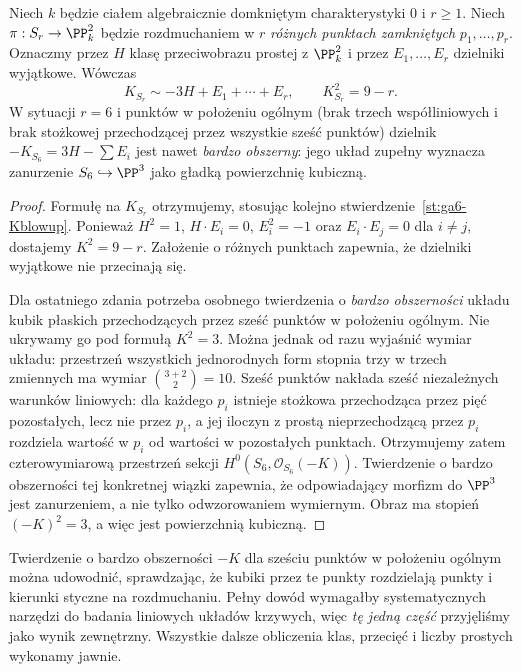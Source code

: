 \begin{stwierdzenie}
\label{st:ga6-del-pezzo-degree}
Niech $k$ będzie ciałem algebraicznie domkniętym
charakterystyki $0$ i $r\ge1$. Niech
$\pi:S_r\to\PP^2_k$ będzie rozdmuchaniem w $r$
\emph{różnych punktach zamkniętych}
$p_1,\ldots,p_r$. Oznaczmy przez $H$ klasę
przeciwobrazu prostej z $\PP^2_k$ i przez
$E_1,\ldots,E_r$ dzielniki wyjątkowe. Wówczas
\[
 K_{S_r}\sim-3H+E_1+\cdots+E_r,
 \qquad K_{S_r}^2=9-r.
\]
W sytuacji $r=6$ i punktów w położeniu ogólnym
(brak trzech współliniowych i brak stożkowej
przechodzącej przez wszystkie sześć punktów)
dzielnik $-K_{S_6}=3H-\sum E_i$ jest nawet
\emph{bardzo obszerny}: jego układ zupełny
wyznacza zanurzenie $S_6\hookrightarrow\PP^3$
jako gładką powierzchnię kubiczną.
\end{stwierdzenie}
\begin{proof}
Formułę na $K_{S_r}$ otrzymujemy, stosując kolejno
stwierdzenie~\ref{st:ga6-Kblowup}. Ponieważ
$H^2=1$, $H\cdot E_i=0$, $E_i^2=-1$
oraz $E_i\cdot E_j=0$ dla $i\ne j$, dostajemy
$K^2=9-r$. Założenie o różnych punktach zapewnia,
że dzielniki wyjątkowe nie przecinają się.

Dla ostatniego zdania potrzeba osobnego twierdzenia
o \emph{bardzo obszerności} układu kubik
płaskich przechodzących przez sześć punktów
w położeniu ogólnym. Nie ukrywamy go pod formułą
$K^2=3$. Można jednak od razu wyjaśnić wymiar
układu: przestrzeń wszystkich jednorodnych form
stopnia trzy w trzech zmiennych ma wymiar
$\binom{3+2}{2}=10$. Sześć punktów nakłada
sześć niezależnych warunków liniowych: dla każdego
$p_i$ istnieje stożkowa przechodząca przez pięć
pozostałych, lecz nie przez $p_i$, a jej iloczyn
z prostą nieprzechodzącą przez $p_i$ rozdziela
wartość w $p_i$ od wartości w pozostałych punktach.
Otrzymujemy zatem czterowymiarową przestrzeń
sekcji $H^0(S_6,\mathcal O_{S_6}(-K))$.
Twierdzenie o bardzo obszerności tej konkretnej
wiązki zapewnia, że odpowiadający morfizm do
$\PP^3$ jest zanurzeniem, a nie tylko odwzorowaniem
wymiernym. Obraz ma stopień
$(-K)^2=3$, a więc jest powierzchnią kubiczną.
\end{proof}

\begin{uwaga}
Twierdzenie o bardzo obszerności $-K$ dla
sześciu punktów w położeniu ogólnym można udowodnić,
sprawdzając, że kubiki przez te punkty rozdzielają
punkty i kierunki styczne na rozdmuchaniu.
Pełny dowód wymagałby systematycznych narzędzi
do badania liniowych układów krzywych, więc
\emph{tę jedną część} przyjęliśmy jako wynik
zewnętrzny. Wszystkie dalsze obliczenia klas,
przecięć i liczby prostych wykonamy jawnie.
\end{uwaga}

